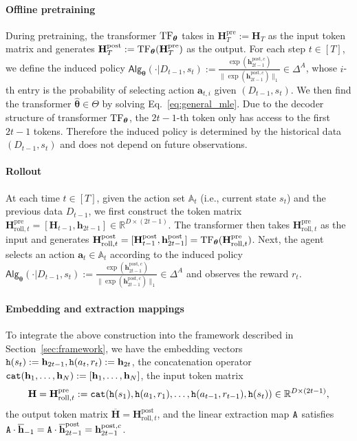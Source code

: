 \documentclass[10pt]{article}
\renewcommand{\bar}{\overline}
\newcommand{\<}{\left\langle}
\renewcommand{\>}{\right\rangle}
\newcommand{\TF}{{\rm TF}}
\newcommand{\R}{\mathbb{R}}
\newcommand{\pre}{{\mathrm{pre}}}
\newcommand{\post}{{\mathrm{post}}}
\newcommand{\partc}{{c}}
\newcommand{\state}{{s}}
\newcommand{\action}{{a}}
\newcommand{\reward}{{r}}
\newcommand{\totlen}{{T}}
\newcommand{\cat}{{\tt cat}}
\newcommand{\extractmap}{{\tt A}}
\newcommand{\embedmap}{{\tt h}}
\newcommand{\sAlg}{{\mathsf{Alg}}}
\newcommand{\dset}{{D}}
\newcommand{\esttfpar}{{\widehat{\btheta}}}
\newcommand{\tfpar}{{\btheta}}
\newcommand{\tfparspace}{{\Theta}}
\newcommand{\roll}{{\mathrm{roll}}}
\def\sA{{\mathbb{A}}}
\def\bH{{\mathbf H}}
\def\btheta{{\boldsymbol \theta}}
\def\ba{{\mathbf a}}
\def\bh{{\mathbf h}}
\begin{document}
\paragraph{Offline pretraining}
During pretraining, the transformer $\TF_\tfpar$ takes in   $\bH_\totlen^\pre:=\bH_\totlen$ as the input token matrix and generates $\bH_\totlen^\post:=\TF_\tfpar(\bH_\totlen^\pre)$ as the output. For each step $t\in[\totlen]$, we define the  induced policy  $\sAlg_\tfpar(\cdot|\dset_{t-1},\state_t):=\frac{\exp(\bh^{\post,\partc}_{2t-1})}{\|\exp(\bh^{\post,\partc}_{2t-1})\|_1}\in\Delta^A$, whose $i$-th entry is the probability of selecting action $\ba_{t,i}$ given $(\dset_{t-1},\state_t)$. We then find the transformer $\esttfpar\in\tfparspace$ by solving Eq.~\eqref{eq:general_mle}.
Due to the decoder structure of transformer $\TF_\tfpar$, the $2t-1$-th token only has access to the first $2t-1$ tokens. Therefore the induced policy is  determined by the historical data $(\dset_{t-1},\state_t)$ and does not depend on future observations.
\paragraph{Rollout}
At each time $t\in[\totlen]$, given the action set $\sA_t$ (i.e., current state $\state_t$) and the previous data $\dset_{t-1}$, we first construct the token matrix $\bH^{\pre}_{\roll,t}=[\bH_{t-1},\bh_{2t-1}]\in\R^{D\times (2t-1)}$.   The transformer then takes $\bH^{\pre}_{\roll,t}$ as the input  and generates $\bH^{\post}_{\roll,t}=[\bH^{\post}_{t-1},\bh^{\post}_{2t-1}]=\TF_\tfpar(\bH^{\pre}_{\roll,t})$. Next,  the agent selects an action $\ba_t\in\sA_t$ according to the induced  policy $\sAlg_\tfpar(\cdot|\dset_{t-1},\state_t):=\frac{\exp(\bh^{\post,\partc}_{2t-1})}{\|\exp(\bh^{\post,\partc}_{2t-1})\|_1}\in\Delta^A$ and observes the reward $r_t$.
\paragraph{Embedding and extraction mappings}
To integrate the above construction into the  framework described in Section~\ref{sec:framework},  we have the embedding vectors $\embedmap(\state_t):=\bh_{2t-1},\embedmap(\action_t,\reward_t):=\bh_{2t}$,  the concatenation operator $\cat(\bh_1, \ldots, \bh_N): = [\bh_1, \ldots, \bh_N]$, the input token matrix  $$\bH=\bH^\pre_{\roll,t}: = \cat(\embedmap(\state_1), \embedmap(\action_1, \reward_1), \ldots, \embedmap(\action_{t-1}, \reward_{t-1}), \embedmap(\state_t)) \in \R^{D \times (2t-1)},$$ the output token matrix $\bar{\bH}=\bH^\post_{\roll,t}$, and the linear extraction map $\extractmap$  satisfies $\extractmap\cdot\bar{\bh}_{-1}=\extractmap\cdot\bar{\bh}^\post_{2t-1}=\bh^{\post,\partc}_{2t-1}$.
\end{document}
